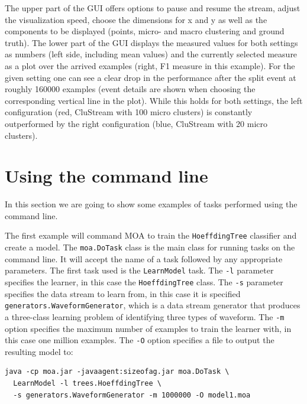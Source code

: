 \documentclass[a4paper,12pt,twoside]{book}
\begin{document}
The upper part of the GUI offers options to pause and resume the stream, adjust the visualization speed, choose the dimensions for x and y as well as the components to be displayed 
(points, micro- and macro clustering and ground truth). The lower part of the GUI displays the measured values for both settings as numbers 
(left side, including mean values) and the currently selected measure as a plot over the arrived examples (right, F1 measure in this example).
 For the given setting one can see a clear drop in the performance after the split event at roughly 160000 examples 
(event details are shown when choosing the corresponding vertical line in the plot). 
While this holds for both settings, the left configuration (red, CluStream with 100 micro clusters) is constantly outperformed by the right configuration 
(blue, CluStream with 20 micro clusters). 



\section{Using the command line}

In this section we are going to show some examples of tasks performed using the command line.

The first example will command MOA to train the \verb+HoeffdingTree+ classifier and create a model. The \verb+moa.DoTask+ class is the main class for running tasks on the command line. It will accept the name of a task followed by any appropriate parameters. The first task used is the \verb+LearnModel+ task. The \verb+-l+ parameter specifies the learner, in this case the \verb+HoeffdingTree+ class. The \verb+-s+ parameter specifies the data stream to learn from, in this case it is
specified  \verb+generators.WaveformGenerator+, which is a data stream generator that produces a three-class learning problem of identifying three types of waveform. The \verb+-m+ option specifies the maximum number of examples to train the learner with, in this case one million examples. The \verb+-O+ option specifies a file to output the resulting model to:

\begin{footnotesize}\begin{verbatim}
java -cp moa.jar -javaagent:sizeofag.jar moa.DoTask \
  LearnModel -l trees.HoeffdingTree \
  -s generators.WaveformGenerator -m 1000000 -O model1.moa
\end{verbatim}\end{footnotesize}
\end{document}
